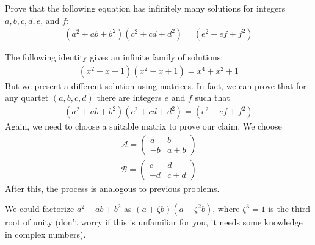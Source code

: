 \begin{problem}
Prove that the following equation has infinitely many solutions for integers $a,b,c,d,e$, and $f$:
\begin{align*}
(a^2+ab+b^2)(c^2+cd+d^2)=(e^2+ef+f^2)
\end{align*}
\end{problem}

\begin{solution}
The following identity gives an infinite family of solutions:
\begin{align*}
(x^2+x+1)(x^2-x+1)=x^4+x^2+1
\end{align*}
But we present a different solution using matrices. In fact, we can prove that for any quartet $(a,b,c,d)$ there are integers $e$ and $f$ such that
\begin{align*}
(a^2+ab+b^2)(c^2+cd+d^2)=(e^2+ef+f^2)
\end{align*}
Again, we need to choose a suitable matrix to prove our claim. We choose
\begin{align*}
\mathcal{A}=\begin{pmatrix}
a & b\\
-b & a+b
\end{pmatrix}\\
\mathcal{B}=\begin{pmatrix}
c & d\\
-d & c+d
\end{pmatrix}
\end{align*}
After this, the process is analogous to previous problems.
\end{solution}

\begin{note}
We could factorize $a^2+ab+b^2$ as $(a+\zeta b)(a+\zeta^2b)$, where $\zeta^3=1$ is the third root of unity (don't worry if this is unfamiliar for you, it needs some knowledge in complex numbers).
\end{note}

